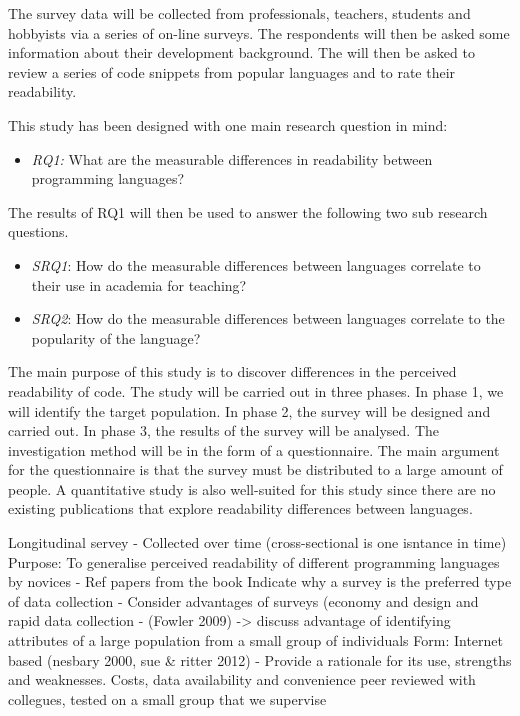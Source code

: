 \documentclass[times, 10pt,twocolumn]{IEEEtran}
\begin{document}
The survey data will be collected from professionals, teachers, students and hobbyists via a series of on-line surveys. The respondents will then be asked some information about their development background. The will then be asked to review a series of code snippets from popular languages and to rate their readability. 
\newline

This study has been designed with one main research question in mind:
\begin{itemize}
\item \textit{RQ1:} What are the measurable differences in readability between programming languages?
\end{itemize}


The results of RQ1 will then be used to answer the following two sub research questions. 
\begin{itemize}
\item \textit{SRQ1}: How do the measurable differences between languages correlate to their use in academia for teaching?
\item \textit{SRQ2}: How do the measurable differences between languages correlate to the popularity of the language?
\end{itemize}


The main purpose of this study is to discover differences in the perceived readability of code. The study will be carried out in three phases. In phase 1, we will identify the target population. In phase 2, the survey will be designed and carried out. In phase 3, the results of the survey will be analysed. The investigation method will be in the form of a questionnaire. The main argument for the questionnaire is that the survey must be distributed to a large amount of people. A quantitative study is also well-suited for this study since there are no existing publications that explore readability differences between languages. 

Longitudinal servey - Collected over time (cross-sectional is one isntance in time)
Purpose: To generalise perceived readability of different programming languages by novices - Ref papers from the book
Indicate why a survey is the preferred type of data collection - Consider advantages of surveys (economy and design and rapid data collection - (Fowler 2009) -> discuss advantage of identifying attributes of a large population from a small group of individuals 
Form: Internet based (nesbary 2000, sue \& ritter 2012) - Provide a rationale for its use, strengths and weaknesses. Costs, data availability and convenience
  peer reviewed with collegues, tested on a small group that we supervise
\end{document}

